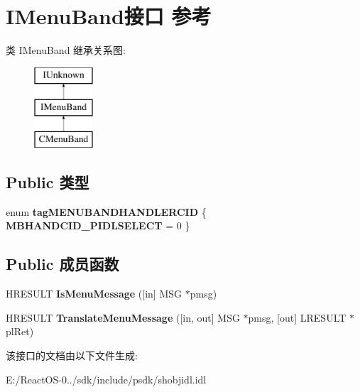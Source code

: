 \hypertarget{interface_i_menu_band}{}\section{I\+Menu\+Band接口 参考}
\label{interface_i_menu_band}
类 I\+Menu\+Band 继承关系图\+:\begin{figure}[H]
\begin{center}
\leavevmode
\includegraphics[height=3.000000cm]{interface_i_menu_band}
\end{center}
\end{figure}
\subsection*{Public 类型}
\begin{DoxyCompactItemize}
\item 
\mbox{\label{interface_i_menu_band_aec858da65d039f7279b7c45980278519}} 
enum {\bfseries tag\+M\+E\+N\+U\+B\+A\+N\+D\+H\+A\+N\+D\+L\+E\+R\+C\+ID} \{ {\bfseries M\+B\+H\+A\+N\+D\+C\+I\+D\+\_\+\+P\+I\+D\+L\+S\+E\+L\+E\+CT} = 0
 \}
\end{DoxyCompactItemize}
\subsection*{Public 成员函数}
\begin{DoxyCompactItemize}
\item 
\mbox{\label{interface_i_menu_band_a640467296ed933e50485f7205b72909e}} 
H\+R\+E\+S\+U\+LT {\bfseries Is\+Menu\+Message} (\mbox{[}in\mbox{]} M\+SG $\ast$pmsg)
\item 
\mbox{\label{interface_i_menu_band_a6b477cc358d67387d15b713f131caf13}} 
H\+R\+E\+S\+U\+LT {\bfseries Translate\+Menu\+Message} (\mbox{[}in, out\mbox{]} M\+SG $\ast$pmsg, \mbox{[}out\mbox{]} L\+R\+E\+S\+U\+LT $\ast$pl\+Ret)
\end{DoxyCompactItemize}


该接口的文档由以下文件生成\+:\begin{DoxyCompactItemize}
\item 
E\+:/\+React\+O\+S-\/0../sdk/include/psdk/shobjidl.\+idl\end{DoxyCompactItemize}
